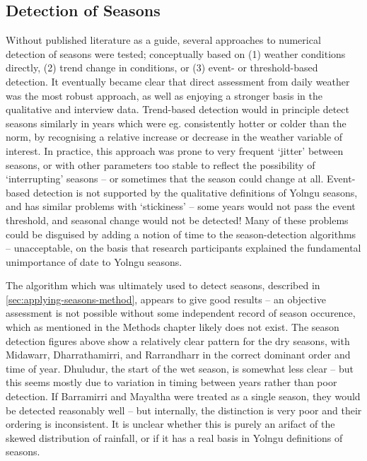 \subsection{Detection of Seasons}
\label{subsec:disc-season-detection}

Without published literature as a guide, several approaches to numerical
detection of seasons were tested; conceptually based on (1) weather conditions
directly, (2) trend change in conditions, or (3) event- or threshold-based
detection.  It eventually became clear that direct assessment from daily
weather was the most robust approach, as well as enjoying a stronger basis
in the qualitative and interview data.
%
Trend-based detection would in principle detect seasons similarly in years
which were eg. consistently hotter or colder than the norm, by recognising
a relative increase or decrease in the weather variable of interest.  In
practice, this approach was prone to very frequent `jitter' between seasons,
or with other parameters too stable to reflect the possibility of `interrupting'
seasons -- or sometimes that the season could change at all.
%
Event-based detection is not supported by the qualitative definitions of Yolngu
seasons, and has similar problems with `stickiness' -- some years would
not pass the event threshold, and seasonal change would not be detected!
%
Many of these problems could be disguised by adding a notion of time to the
season-detection algorithms -- unacceptable, on the basis that research
participants explained the fundamental unimportance of date to Yolngu seasons.


The algorithm which was ultimately used to detect seasons,
described in \cref{sec:applying-seasons-method}, appears to give good results
-- an objective assessment is not possible without some independent record of
season occurence, which as mentioned in the Methods chapter likely does not exist.
%
The season detection figures above show a relatively clear pattern for the
dry seasons, with Midawarr, Dharrathamirri, and Rarrandharr in the correct
dominant order and time of year.  Dhuludur, the start of the wet season, is
somewhat less clear -- but this seems mostly due to variation in timing between
years rather than poor detection.  If Barramirri and Mayaltha were treated as
a single season, they would be detected reasonably well -- but internally,
the distinction is very poor and their ordering is inconsistent. It is unclear
whether this is purely an arifact of the skewed distribution of rainfall,
or if it has a real basis in Yolngu definitions of seasons.


